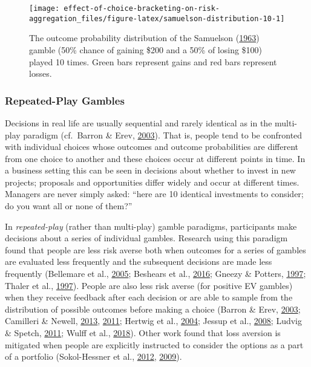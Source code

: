 \documentclass[
  english,
  man, donotrepeattitle,floatsintext]{apa7}
\theoremstyle{definition}
\theoremstyle{definition}
\theoremstyle{definition}
\theoremstyle{definition}
\theoremstyle{remark}
\begin{document}
\begin{figure}
\texttt{[image: effect-of-choice-bracketing-on-risk-aggregation\_files/figure-latex/samuelson-distribution-10-1]} \caption{The outcome probability distribution of the Samuelson (\protect\hyperlink{ref-samuelson1963}{1963}) gamble (50\% chance of gaining \$200 and a 50\% of losing \$100) played 10 times. Green bars represent gains and red bars represent losses.}\label{fig:samuelson-distribution-10}
\end{figure}

\hypertarget{repeated-play-gambles}{%
\subsubsection{Repeated-Play Gambles}\label{repeated-play-gambles}}

Decisions in real life are usually sequential and rarely identical as in the
multi-play paradigm (cf.~Barron \& Erev, \protect\hyperlink{ref-barron2003}{2003}). That is, people tend to be confronted
with individual choices whose outcomes and outcome probabilities are different
from one choice to another and these choices occur at different points in time.
In a business setting this can be seen in decisions about whether to invest in
new projects; proposals and opportunities differ widely and occur at different
times. Managers are never simply asked: ``here are 10 identical investments to
consider; do you want all or none of them?''

In \emph{repeated-play} (rather than multi-play) gamble paradigms, participants make
decisions about a series of individual gambles. Research using this paradigm
found that people are less risk averse both when outcomes for a series of
gambles are evaluated less frequently and the subsequent decisions are made less
frequently (Bellemare et al., \protect\hyperlink{ref-bellemare2005}{2005}; Beshears et al., \protect\hyperlink{ref-beshears2016}{2016}; Gneezy \& Potters, \protect\hyperlink{ref-gneezy1997}{1997}; Thaler et al., \protect\hyperlink{ref-thaler1997}{1997}). People are
also less risk averse (for positive EV gambles) when they receive feedback after
each decision or are able to sample from the distribution of possible outcomes
before making a choice (Barron \& Erev, \protect\hyperlink{ref-barron2003}{2003}; Camilleri \& Newell, \protect\hyperlink{ref-camilleri2013}{2013}, \protect\hyperlink{ref-camilleri2011}{2011}; Hertwig et al., \protect\hyperlink{ref-hertwig2004}{2004}; Jessup et al., \protect\hyperlink{ref-jessup2008}{2008}; Ludvig \& Spetch, \protect\hyperlink{ref-ludvig2011}{2011}; Wulff et al., \protect\hyperlink{ref-wulff2018}{2018}). Other work found that loss aversion is
mitigated when people are explicitly instructed to consider the options as a
part of a portfolio (Sokol-Hessner et al., \protect\hyperlink{ref-sokolhessner2012}{2012}, \protect\hyperlink{ref-sokolhessner2009}{2009}).
\end{document}
